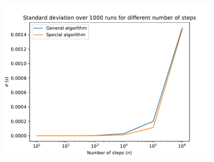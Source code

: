 \documentclass[english,notitlepage]{revtex4-1}  %
\begin{document}
\begin{figure}[H]
  \centering
  \includegraphics[width=.7\textwidth]{../figures/std_time.pdf}
  \caption{}
  \label{fig:std_time}
\end{figure}
\end{document}
